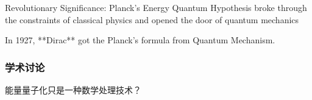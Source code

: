 \begin{frame}
    \begin{tcolorbox1}{Revolutionary Significance:}
        Planck's Energy Quantum Hypothesis broke through the constraints of classical physics and 
        opened the door of quantum mechanics 
    \end{tcolorbox1}
\end{frame}

\begin{frame}
    \begin{tcolorbox}[colback=yellow!10,colframe=red!75!black,title=THE END]
        In 1927, **Dirac** got the Planck's formula from Quantum Mechanism.
    \end{tcolorbox}
\end{frame}

\begin{frame}
    \frametitle{学术讨论}
    \begin{center}
        {\color{red} \Large 能量量子化只是一种数学处理技术？}  
    \end{center}
\end{frame}
